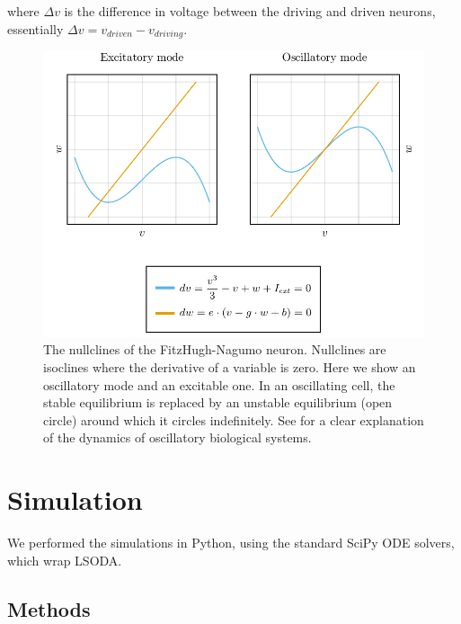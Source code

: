 \documentclass[
    11pt,
]{article}
\begin{document}
where $\Delta v$ is the difference in voltage between the driving and driven neurons, essentially $\Delta v = v_{driven} - v_{driving}$.

\begin{figure}[h!]
    \label{fig: fhn_dynamics}
    \centering
    \includegraphics{figures/fhn_dynamics/fhn_dynamics.pdf}
    \caption{The nullclines of the FitzHugh-Nagumo neuron.  Nullclines are isoclines where the derivative of a variable is zero.  Here we show an oscillatory mode and an excitable one.  In an oscillating cell, the stable equilibrium is replaced by an unstable equilibrium (open circle) around which it circles indefinitely.  See \citet{parsons2018} for a clear explanation of the dynamics of oscillatory biological systems.}
\end{figure} %



\section{Simulation}

We performed the simulations in Python, using the standard SciPy ODE solvers, which wrap LSODA. %

\subsection{Methods}
\end{document}
